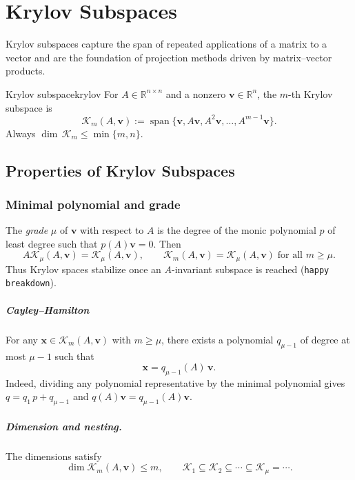 \documentclass[../../main.tex]{subfiles}
\begin{document}
\chapter{Krylov Subspaces}\label{chap:krylov}

Krylov subspaces capture the span of repeated applications of a matrix to a vector and are the foundation of projection methods driven by matrix--vector products.

\begin{definition}{Krylov subspace}{krylov}
  For $A\in\mathbb{R}^{n\times n}$ and a nonzero $\mathbf{v}\in\mathbb{R}^n$, the $m$-th Krylov subspace is
  \[
    \mathcal{K}_m(A,\mathbf{v}) := \operatorname{span}\{\mathbf{v},A\mathbf{v},A^2\mathbf{v},\ldots,A^{m-1}\mathbf{v}\}.
  \]
  Always $\dim\,\mathcal{K}_m\le \min\{m,n\}$.
\end{definition}

\section{Properties of Krylov Subspaces}
\label{sec:properties-krylov-subspaces}

\subsection{Minimal polynomial and grade}
The \emph{grade} $\mu$ of $\mathbf{v}$ with respect to $A$ is the degree of the monic polynomial $p$ of least degree such that $p(A)\mathbf{v}=0$. Then
\[
  A\mathcal{K}_\mu(A,\mathbf{v}) = \mathcal{K}_\mu(A,\mathbf{v}),\qquad \mathcal{K}_m(A,\mathbf{v})=\mathcal{K}_\mu(A,\mathbf{v})\;\text{for all }m\ge \mu.
\]
Thus Krylov spaces stabilize once an $A$-invariant subspace is reached (\texttt{happy breakdown}).

\paragraph{Cayley--Hamilton} For any $\mathbf{x}\in\mathcal{K}_m(A,\mathbf{v})$ with $m\ge\mu$, there exists a polynomial $q_{\mu-1}$ of degree at most $\mu-1$ such that
\[
  \mathbf{x}=q_{\mu-1}(A)\,\mathbf{v}.
\]
Indeed, dividing any polynomial representative by the minimal polynomial gives $q=q_1\,p+q_{\mu-1}$ and $q(A)\mathbf{v}=q_{\mu-1}(A)\mathbf{v}$.

\paragraph{Dimension and nesting.} The dimensions satisfy
\[
  \dim\mathcal{K}_m(A,\mathbf{v}) \le m,\qquad \mathcal{K}_1\subseteq\mathcal{K}_2\subseteq\cdots\subseteq\mathcal{K}_\mu=\cdots.
\]
\end{document}
